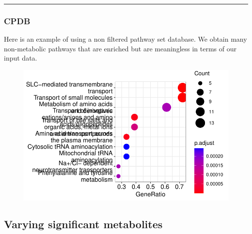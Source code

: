 \documentclass[
  24px,
  letterpaper,
  DIV=11,
  numbers=noendperiod]{scrartcl}
\newenvironment{Shaded}{\begin{snugshade}}{\end{snugshade}}
\newcommand{\AttributeTok}[1]{\textcolor[rgb]{0.40,0.45,0.13}{#1}}
\newcommand{\FunctionTok}[1]{\textcolor[rgb]{0.28,0.35,0.67}{#1}}
\newcommand{\NormalTok}[1]{\textcolor[rgb]{0.00,0.23,0.31}{#1}}
\newcommand{\OtherTok}[1]{\textcolor[rgb]{0.00,0.23,0.31}{#1}}
\newcommand{\SpecialCharTok}[1]{\textcolor[rgb]{0.37,0.37,0.37}{#1}}
\newcommand{\StringTok}[1]{\textcolor[rgb]{0.13,0.47,0.30}{#1}}
\begin{document}
\begin{center}\rule{0.5\linewidth}{0.5pt}\end{center}

\hypertarget{cpdb-1}{%
\subsubsection{CPDB}\label{cpdb-1}}

Here is an example of using a non filtered pathway set database. We
obtain many non-metabolic pathways that are enriched but are meaningless
in terms of our input data.

\begin{Shaded}
\end{Shaded}

\begin{figure}[H]

{\centering \includegraphics{index_files/figure-pdf/unnamed-chunk-22-1.pdf}

}

\end{figure}

\hypertarget{varying-significant-metabolites}{%
\subsection{Varying significant
metabolites}\label{varying-significant-metabolites}}
\end{document}

